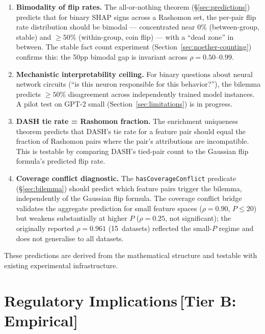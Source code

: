 \documentclass[11pt,a4paper]{article}
\begin{document}
\begin{enumerate}
  \item \textbf{Bimodality of flip rates.} The all-or-nothing theorem (\S\ref{sec:predictions}) predicts that for binary SHAP signs across a Rashomon set, the per-pair flip rate distribution should be bimodal --- concentrated near $0\%$ (between-group, stable) and $\geq 50\%$ (within-group, coin flip) --- with a ``dead zone'' in between. The stable fact count experiment (Section~\ref{sec:noether-counting}) confirms this: the 50pp bimodal gap is invariant across $\rho = 0.50$--$0.99$.

  \item \textbf{Mechanistic interpretability ceiling.} For binary questions about neural network circuits (``is this neuron responsible for this behavior?''), the bilemma predicts $\geq 50\%$ disagreement across independently trained model instances. A pilot test on GPT-2 small (Section~\ref{sec:limitations}) is in progress.

  \item \textbf{DASH tie rate = Rashomon fraction.} The enrichment uniqueness theorem predicts that DASH's tie rate for a feature pair should equal the fraction of Rashomon pairs where the pair's attributions are incompatible. This is testable by comparing DASH's tied-pair count to the Gaussian flip formula's predicted flip rate.

  \item \textbf{Coverage conflict diagnostic.} The \texttt{hasCoverageConflict} predicate (\S\ref{sec:bilemma}) should predict which feature pairs trigger the bilemma, independently of the Gaussian flip formula. The coverage conflict bridge validates the aggregate prediction for small feature spaces ($\rho = 0.90$, $P \leq 20$) but weakens substantially at higher $P$ ($\rho = 0.25$, not significant); the originally reported $\rho = 0.961$ (15~datasets) reflected the small-$P$ regime and does not generalise to all datasets.
\end{enumerate}

These predictions are derived from the mathematical structure and testable with existing experimental infrastructure.

\section{Regulatory Implications\,\textnormal{\normalsize[Tier B: Empirical]}}
\label{sec:regulatory}
\end{document}
